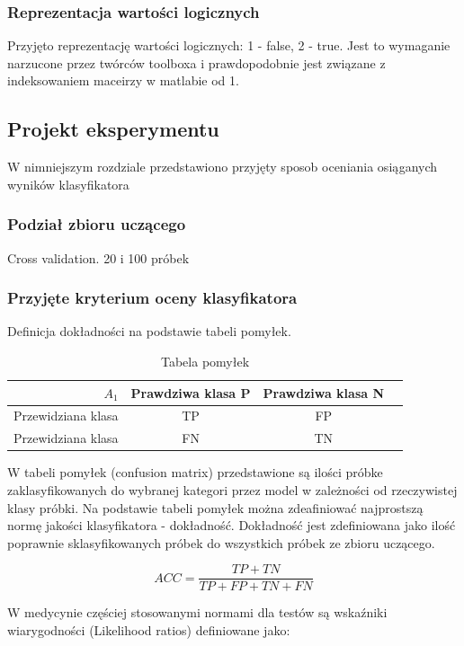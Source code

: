 \documentclass{article}
\begin{document}
\subsubsection{Reprezentacja wartości logicznych}
Przyjęto reprezentację wartości logicznych: 1 - false, 2 - true. Jest to wymaganie narzucone przez twórców toolboxa i prawdopodobnie jest związane z indeksowaniem maceirzy w matlabie od 1. 

\subsection{Projekt eksperymentu}
W nimniejszym rozdziale przedstawiono przyjęty sposob oceniania osiąganych wyników klasyfikatora

\subsubsection{Podział zbioru uczącego}
Cross validation. 20 i 100 próbek

\subsubsection{Przyjęte kryterium oceny klasyfikatora}
Definicja dokładności na podstawie tabeli pomyłek.

\begin{table}
\caption{Tabela pomyłek}
\label{nosiy OR}
\centering
\begin{tabular}{|r|c|c|c|}
  \hline 
  $A_1$ & Prawdziwa klasa P &Prawdziwa klasa N \\
  \hline
  Przewidziana klasa & TP & FP \\
  \hline
  Przewidziana klasa & FN & TN \\
  \hline
\end{tabular}
\end{table}

W tabeli pomyłek (confusion matrix) przedstawione są ilości próbke zaklasyfikowanych do wybranej kategori przez model w zależności od rzeczywistej klasy próbki. Na podstawie tabeli pomyłek można zdeafiniować najprostszą normę jakości klasyfikatora - dokładność. Dokładność jest zdefiniowana jako ilość poprawnie sklasyfikowanych próbek do wszystkich próbek ze zbioru uczącego.

\begin{equation}
	ACC = \frac{TP+TN}{TP+FP+TN+FN}
\end{equation}

W medycynie częściej stosowanymi normami dla testów są wskaźniki wiarygodności (Likelihood ratios) definiowane jako:
\end{document}
